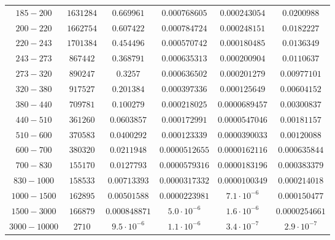 \documentclass[11pt]{article}
\begin{document}
\begin{table}[htbp]
{\begin{tabular}{cccccc}
		$185-200$ & $1631284$ & $0.669961$ & $0.000768605$              & $0.000243054$         & $0.0200988$ \\
		$200-220$ & $1662754$ & $0.607422$ & $0.000784724$              & $0.000248151$         & $0.0182227$ \\
		$220-243$ & $1701384$ & $0.454496$ & $0.000570742$              & $0.000180485$         & $0.0136349$ \\
		$243-273$ & $867442$ & $0.368791$ & $0.000635313$               & $0.000200904$         & $0.0110637$ \\
		$273-320$ & $890247$ & $0.3257$ & $0.000636502$                 & $0.000201279$         & $0.00977101$ \\
		$320-380$ & $917527$ & $0.201384$ & $0.000397336$               & $0.000125649$         & $0.00604152$ \\
		$380-440$ & $709781$ & $0.100279$ & $0.000218025$               & $0.0000689457$        & $0.00300837$ \\
		$440-510$ & $361260$ & $0.0603857$ & $0.000172991$              & $0.0000547046$        & $0.00181157$ \\
		$510-600$ & $370583$ & $0.0400292$ & $0.000123339$              & $0.0000390033$        & $0.00120088$ \\
		$600-700$ & $380320$ & $0.0211948$ & $0.0000512655$             & $0.0000162116$        & $0.000635844$ \\
		$700-830$ & $155170$ & $0.0127793$ & $0.0000579316$             & $0.0000183196$        & $0.000383379$ \\
		$830-1000$ & $158533$ & $0.00713393$ & $0.0000317332$           & $0.0000100349$        & $0.000214018$ \\
		$1000-1500$ & $162895$ & $0.00501588$ & $0.0000223981$          & $7.1\cdot 10^{-6}$    & $0.000150477$ \\
		$1500-3000$ & $166879$ & $0.000848871$ & $5.0\cdot 10^{-6}$     & $1.6\cdot 10^{-6}$    & $0.0000254661$ \\
		$3000-10000$ & $2710$ &	$9.5\cdot 10^{-6}$ & $1.1\cdot 10^{-6}$ & $3.4\cdot 10^{-7}$    & $2.9\cdot 10^{-7}$ \\
	\bottomrule
	\end{tabular}
}
\end{table}
\end{document}
